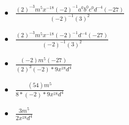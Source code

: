 \documentclass{article}
\begin{document}
\begin{enumerate}
\begin{itemize}
  \item {\Large $\frac{(2)^{-3}m^{5}x^{-18}(-2)^{-1}a^{0}b^{0}c^{0}d^{-4}(-27)}{(-2)^{-1}(3)^{2}}$}
  \item {\Large $\frac{(2)^{-3}m^{5}x^{-18}(-2)^{-1}d^{-4}(-27)}{(-2)^{-1}(3)^{2}}$}
  \item {\Large $\frac{(-2)m^{5}(-27)}{(2)^{3}(-2)*9x^{18}d^{4}}$}
  \item {\Large $\frac{(54)m^{5}}{8*(-2)*9x^{18}d^{4}}$}
  \item {\Large $\frac{3m^{5}}{2x^{18}d^{4}}$}
  \end{itemize}
\end{enumerate}
\end{document}
